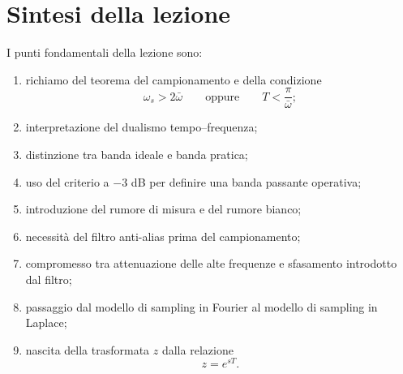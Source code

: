 \section{Sintesi della lezione}

I punti fondamentali della lezione sono:
\begin{enumerate}
    \item richiamo del teorema del campionamento e della condizione
    \[
    \omega_s>2\bar\omega
    \qquad\text{oppure}\qquad
    T<\frac{\pi}{\bar\omega};
    \]
    \item interpretazione del dualismo tempo--frequenza;
    \item distinzione tra banda ideale e banda pratica;
    \item uso del criterio a \(-3\) dB per definire una banda passante operativa;
    \item introduzione del rumore di misura e del rumore bianco;
    \item necessità del filtro anti-alias prima del campionamento;
    \item compromesso tra attenuazione delle alte frequenze e sfasamento introdotto dal filtro;
    \item passaggio dal modello di sampling in Fourier al modello di sampling in Laplace;
    \item nascita della trasformata \(z\) dalla relazione
    \[
    z=e^{sT}.
    \]
\end{enumerate}